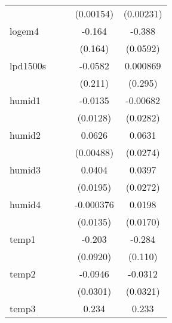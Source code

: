 {\begin{tabular}{l*{4}{c}}
            &                     &                     &   (0.00154)         &   (0.00231)         \\
[1em]
logem4      &                     &                     &      -0.164         &      -0.388\sym{***}\\
            &                     &                     &     (0.164)         &    (0.0592)         \\
[1em]
lpd1500s    &                     &                     &     -0.0582         &    0.000869         \\
            &                     &                     &     (0.211)         &     (0.295)         \\
[1em]
humid1      &                     &                     &     -0.0135         &    -0.00682         \\
            &                     &                     &    (0.0128)         &    (0.0282)         \\
[1em]
humid2      &                     &                     &      0.0626\sym{***}&      0.0631\sym{*}  \\
            &                     &                     &   (0.00488)         &    (0.0274)         \\
[1em]
humid3      &                     &                     &      0.0404         &      0.0397         \\
            &                     &                     &    (0.0195)         &    (0.0272)         \\
[1em]
humid4      &                     &                     &   -0.000376         &      0.0198         \\
            &                     &                     &    (0.0135)         &    (0.0170)         \\
[1em]
temp1       &                     &                     &      -0.203\sym{*}  &      -0.284\sym{*}  \\
            &                     &                     &    (0.0920)         &     (0.110)         \\
[1em]
temp2       &                     &                     &     -0.0946\sym{**} &     -0.0312         \\
            &                     &                     &    (0.0301)         &    (0.0321)         \\
[1em]
temp3       &                     &                     &       0.234\sym{**} &       0.233\sym{***}\\

\end{tabular}}
